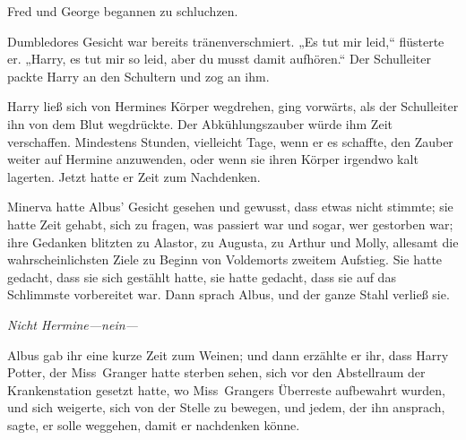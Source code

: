 Fred und George begannen zu schluchzen.

Dumbledores Gesicht war bereits tränenverschmiert. „Es tut mir leid,“ flüsterte er. „Harry, es tut mir so leid, aber du musst damit aufhören.“ Der Schulleiter packte Harry an den Schultern und zog an ihm.


Harry ließ sich von Hermines Körper wegdrehen, ging vorwärts, als der Schulleiter ihn von dem Blut wegdrückte. Der Abkühlungszauber würde ihm Zeit verschaffen. Mindestens Stunden, vielleicht Tage, wenn er es schaffte, den Zauber weiter auf Hermine anzuwenden, oder wenn sie ihren Körper irgendwo kalt lagerten. Jetzt hatte er Zeit zum Nachdenken.

\later


Minerva hatte Albus' Gesicht gesehen und gewusst, dass etwas nicht stimmte; sie hatte Zeit gehabt, sich zu fragen, was passiert war und sogar, wer gestorben war; ihre Gedanken blitzten zu Alastor, zu Augusta, zu Arthur und Molly, allesamt die wahrscheinlichsten Ziele zu Beginn von Voldemorts zweitem Aufstieg. Sie hatte gedacht, dass sie sich gestählt hatte, sie hatte gedacht, dass sie auf das Schlimmste vorbereitet war. Dann sprach Albus, und der ganze Stahl verließ sie.

\emph{Nicht Hermine—nein—}

Albus gab ihr eine kurze Zeit zum Weinen; und dann erzählte er ihr, dass Harry Potter, der Miss~Granger hatte sterben sehen, sich vor den Abstellraum der Krankenstation gesetzt hatte, wo Miss~Grangers Überreste aufbewahrt wurden, und sich weigerte, sich von der Stelle zu bewegen, und jedem, der ihn ansprach, sagte, er solle weggehen, damit er nachdenken könne.

